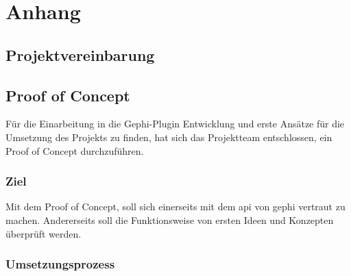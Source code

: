 \chapter{Anhang}

\section{Projektvereinbarung}
\label{projektvereinbarung}

\newpage

\section{Proof of Concept}
\label{poc}

Für die Einarbeitung in die Gephi-Plugin Entwicklung und erste Ansätze für die Umsetzung des Projekts zu finden, hat
sich das Projektteam entschlossen, ein Proof of Concept durchzuführen.

\subsection{Ziel}

Mit dem Proof of Concept, soll sich einerseits mit dem \ac{api} von \acs{gephi} vertraut zu machen.
Andererseits soll die Funktionsweise von ersten Ideen und Konzepten überprüft werden.

\subsection{Umsetzungsprozess}

